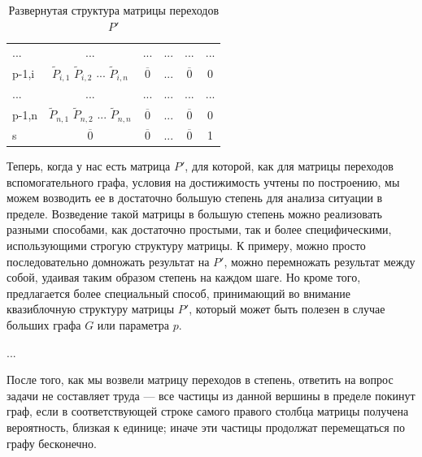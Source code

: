 \begin{table}[H]
\begin{tabular}{l || c | c | c | c | c}
			... & ... & ... & ... & ... & ... \\
			p-1,i & $\tilde{P}_{i,1}$ $\tilde{P}_{i,2}$ ... $\tilde{P}_{i,n}$ & $\overline 0$ & ... & $\overline 0$ & 0 \\
			... & ... & ... & ... & ... & ... \\
			p-1,n & $\tilde{P}_{n,1}$ $\tilde{P}_{n,2}$ ... $\tilde{P}_{n,n}$ & $\overline 0$ & ... & $\overline 0$ & 0 \\
			\hline \hline
			s  & $\overline 0$ & $\overline 0$ & ... & $\overline 0$ & 1 \\
		\end{tabular}
		\caption{Развернутая структура матрицы переходов $P'$}
		\label{tabl:P'}
	\end{table}
	
	Теперь, когда у нас есть матрица $P'$, для которой, как для матрицы переходов вспомогательного графа, условия на достижимость учтены по построению, мы можем возводить ее в достаточно большую степень для анализа ситуации в пределе. Возведение такой матрицы в большую степень можно реализовать разными способами, как достаточно простыми, так и более специфическими, использующими строгую структуру матрицы. К примеру, можно просто последовательно домножать результат на $P'$, можно перемножать результат между собой, удаивая таким образом степень на каждом шаге. Но кроме того, предлагается более специальный способ, принимающий во внимание квазиблочную структуру матрицы $P'$, который может быть полезен в случае больших графа $G$ или параметра $p$.	
	
	...
	
	После того, как мы возвели матрицу переходов в степень, ответить на вопрос задачи не составляет труда --- все частицы из данной вершины в пределе покинут граф, если в соответствующей строке самого правого столбца матрицы получена вероятность, близкая к единице; иначе эти частицы продолжат перемещаться по графу бесконечно. 
	
	\newpage %
	
	\printbibliography[
	heading=bibintoc%
	,title=Библиография %
	]
	

